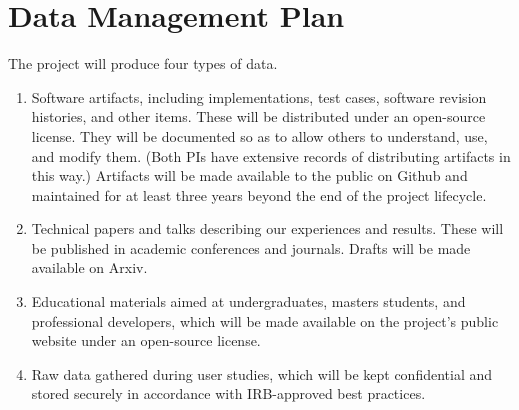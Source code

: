 \section*{Data Management Plan}

The project will produce four types of data.

\begin{enumerate}
\item Software artifacts,
including implementations, test cases, software revision histories, and
other items.  These will be distributed under an open-source
license.  They will be documented so as to allow others to understand,
use, and modify them.  (Both PIs have extensive records of
distributing artifacts in this way.)  Artifacts will be made available
to the public on Github and maintained for at least three years beyond
the end of the project lifecycle.

\item Technical papers and talks describing our experiences
and results.  These will be published in academic conferences and journals.
Drafts will be made available on Arxiv.

\item Educational materials aimed at undergraduates, masters students,
and professional developers, which will be made available on the
project's public website under an open-source license.

\item Raw data gathered during user studies, which will be kept
confidential and stored securely in accordance with IRB-approved best
practices.
\end{enumerate}

